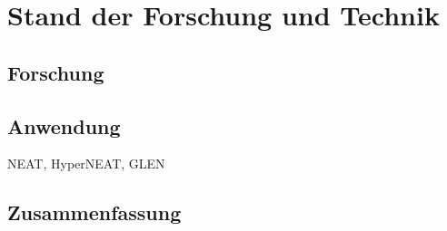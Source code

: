 \section{Stand der Forschung und Technik}
\subsection{Forschung}

\subsection{Anwendung}
NEAT, HyperNEAT, GLEN

\subsection{Zusammenfassung}
